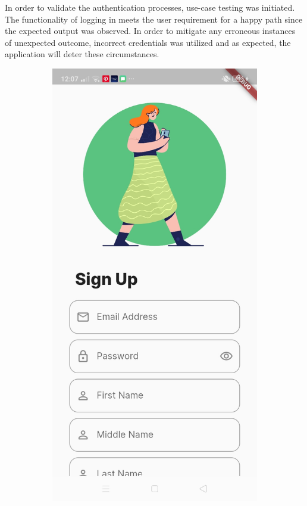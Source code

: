 In order to validate the authentication processes, use-case testing was initiated. The functionality of logging in meets the user requirement for a happy path since the expected output was observed. In order to mitigate any erroneous instances of unexpected outcome, incorrect credentials was utilized and as expected, the application will deter these circumstances.

\begin{figure}[!h]
    \centering
    \begin{subfigure}[c]{0.30\linewidth}
        \centering
        \includegraphics[scale=0.15]{figures/Chapter4/Main/SignUp-1.jpg}

\end{subfigure}
\end{figure}
